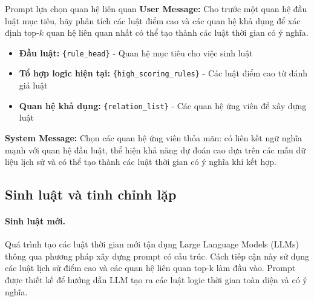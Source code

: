 \begin{promptbox}{Prompt lựa chọn quan hệ liên quan}
\textbf{User Message:}
Cho trước một quan hệ đầu luật mục tiêu, hãy phân tích các luật điểm cao và các quan hệ khả dụng để xác định top-$k$ quan hệ liên quan nhất có thể tạo thành các luật thời gian có ý nghĩa.
\begin{itemize}
    \item \textbf{Đầu luật:} \texttt{\{rule\_head\}} - Quan hệ mục tiêu cho việc sinh luật
    \item \textbf{Tổ hợp logic hiện tại:} \texttt{\{high\_scoring\_rules\}} - Các luật điểm cao từ đánh giá luật
    \item \textbf{Quan hệ khả dụng:} \texttt{\{relation\_list\}} - Các quan hệ ứng viên để xây dựng luật
\end{itemize}

\textbf{System Message:} Chọn các quan hệ ứng viên thỏa mãn: có liên kết ngữ nghĩa mạnh với quan hệ đầu luật, thể hiện khả năng dự đoán cao dựa trên các mẫu dữ liệu lịch sử và có thể tạo thành các luật thời gian có ý nghĩa khi kết hợp.
\end{promptbox}


\subsection{Sinh luật và tinh chỉnh lặp}

\paragraph{Sinh luật mới.}
Quá trình tạo các luật thời gian mới tận dụng Large Language Models (LLMs) thông qua phương pháp xây dựng prompt có cấu trúc. Cách tiếp cận này sử dụng các luật lịch sử điểm cao và các quan hệ liên quan top-k làm đầu vào. Prompt được thiết kế để hướng dẫn LLM tạo ra các luật logic thời gian toàn diện và có ý nghĩa.


